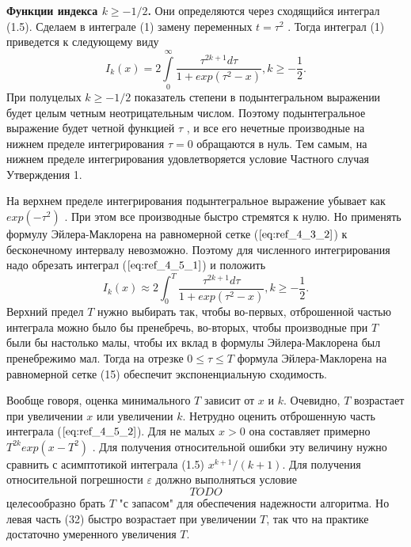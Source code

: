 \textbf{Функции индекса $k \geqslant -1/2$.} Они определяются через сходящийся
интеграл (1.5). Сделаем в интеграле (1) замену переменных $t=\tau^2$ . Тогда интеграл
(1) приведется к следующему виду
\begin{equation}
I_k(x)=2 \int\limits_0^{\infty} \frac{\tau^{2k+1}d\tau}{1+exp(\tau^2 - x)}, k \geqslant -\frac{1}{2}.
\label{eq:ref_4_5_1}
\end{equation}
При полуцелых $k \geqslant -1/2$ показатель степени в подынтегральном выражении
будет целым четным неотрицательным числом. Поэтому подынтегральное
выражение будет четной функцией $\tau$ , и все его нечетные производные на
нижнем пределе интегрирования $\tau = 0$ обращаются в нуль. Тем самым, на
нижнем пределе интегрирования удовлетворяется условие Частного случая
Утверждения 1.

На верхнем пределе интегрирования подынтегральное выражение убывает
как $exp(-\tau^2)$ . При этом все производные быстро стремятся к нулю. Но
применять формулу Эйлера-Маклорена на равномерной сетке ($\ref{eq:ref_4_3_2}$) к
бесконечному интервалу невозможно. Поэтому для численного интегрирования
надо обрезать интеграл ($\ref{eq:ref_4_5_1}$) и положить
\begin{equation}
I_k(x) \approx 2\int_0^{T} \frac{\tau^{2k+1}d\tau}{1+exp(\tau^2 - x)}, k \geqslant -\frac{1}{2}.
\label{eq:ref_4_5_2}
\end{equation}
Верхний предел $T$ нужно выбирать так, чтобы во-первых, отброшенной частью
интеграла можно было бы пренебречь, во-вторых, чтобы производные при $T$
были бы настолько малы, чтобы их вклад в формулы Эйлера-Маклорена был
пренебрежимо мал. Тогда на отрезке $0 \leqslant \tau \leqslant T$ формула Эйлера-Маклорена на
равномерной сетке (15) обеспечит экспоненциальную сходимость.

Вообще говоря, оценка минимального $T$ зависит от $x$ и $k$. Очевидно,
$T$ возрастает при увеличении $x$ или увеличении $k$. Нетрудно оценить
отброшенную часть интеграла ($\ref{eq:ref_4_5_2}$). Для не малых $x > 0$ она составляет
примерно  $T^{2k}exp(x-T^2)$ . Для получения относительной ошибки эту величину
нужно сравнить с асимптотикой интеграла (1.5) $x^{k+1}/(k+1)$. Для получения
относительной погрешности $\varepsilon$ должно выполняться условие
\begin{equation}
TODO
\end{equation}
целесообразно брать $T$ "с запасом" для обеспечения надежности алгоритма. Но
левая часть (32) быстро возрастает при увеличении $T$, так что на практике
достаточно умеренного увеличения $T$.

